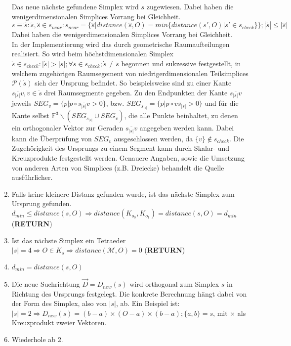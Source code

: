 \begin{enumerate}
Das neue nächste gefundene Simplex wird $s$ zugewiesen. Dabei haben die wenigerdimensionalen Simplices Vorrang bei Gleichheit. $s \equiv \tilde{s} : \tilde{s},\hat{s} \in s_{near} : s_{near} = \{\hat{s} | distance(\hat{s}, O) = min\{distance(s', O) | s' \in s_{check}\}\}; |\tilde{s}| \leq |\hat{s}|$ 
Dabei haben die wenigerdimensionalen Simplices Vorrang bei Gleichheit.\\
	 In der Implementierung wird das durch geometrische Raumaufteilungen realisiert. So wird beim höchstdimensionalen Simplex $\dot{s}\in s_{check}: |\dot{s}| > |\ddot{s}|; \forall \ddot{s} \in s_{check}; \dot{s}\neq\ddot{s}$ begonnen und sukzessive festgestellt, in welchem zugehörigen Raumsegement von niedrigerdimensionalen Teilsimplices $\mathcal{P}(\dot{s})$ sich der Ursprung befindet. So beispielsweise sind zu einer Kante $\overline{s_{|s|}v}, v\in \dot{s}$ drei Raumsegmente gegeben. Zu den Endpunkten der Kante $\overline{s_{|s|}v}$ jeweils $SEG_{v} = \{p | p \circ \overline{s_{|s|}v} > 0\}$, bzw.  $SEG_{s_{|s|}} = \{p | p \circ \overline{vs_{|s|}} > 0\}$ und für die Kante selbst $\mathbb{F}^3 \backslash (SEG_{s_{|s|}} \cup SEG_{v})$, die alle Punkte beinhaltet, zu denen ein orthogonaler Vektor zur Geraden $\overline{s_{|s|}v}$ angegeben werden kann. Dabei kann die Überprüfung von $SEG_v$ ausgeschlossen werden, da $\{v\} \notin s_{check}$.
	 Die Zugehörigkeit des Ursprungs zu einem Segment kann durch Skalar- und Kreuzprodukte festgestellt werden. Genauere Angaben, sowie die Umsetzung von anderen Arten von Simplices (z.B. Dreiecke) behandelt die Quelle \cite{gjk-casey} ausführlicher.
	\item Falls keine kleinere Distanz gefunden wurde, ist das nächste Simplex zum Ursprung gefunden. $d_{min} \leq distance(s, O) \Rightarrow distance(K_{o_0}, K_{o_1}) = distance(s, O) = d_{min}$ (\textbf{RETURN})
	\item Ist das nächste Simplex ein Tetraeder $|s| = 4 \Rightarrow O \in K_s \Rightarrow distance(\mathcal{M}, O) = 0$ (\textbf{RETURN})
	\item $d_{min} = distance(s, O)$
	\item Die neue Suchrichtung $\vec{D} = D_{new}(s)$ wird orthogonal zum Simplex $s$ in Richtung des Ursprungs festgelegt. Die konkrete Berechnung hängt dabei von der Form des Simplex, also von $|s|$, ab. Ein Beispiel ist: $|s| = 2 \Rightarrow D_{new}(s) = (b-a)\times (O-a)\times (b-a);  \{a, b\} = s$, mit $\times$ als Kreuzprodukt zweier Vektoren.
	\item Wiederhole ab 2.
\end{enumerate}
